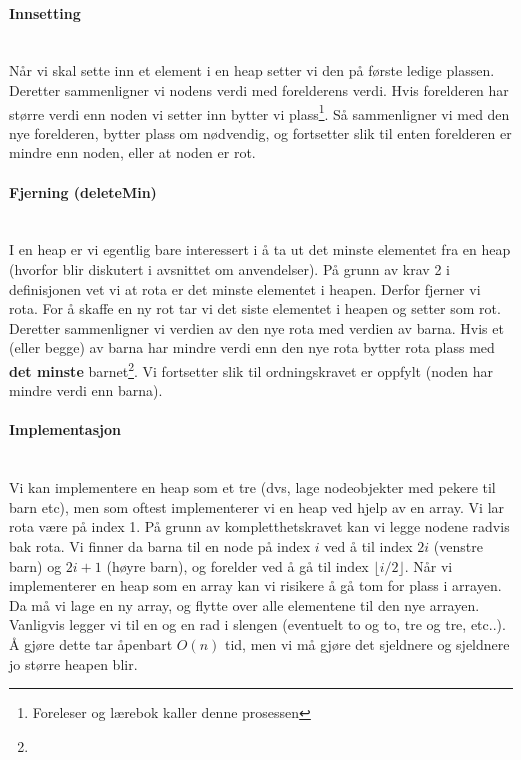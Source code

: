 \paragraph{Innsetting}~\\
Når vi skal sette inn et element i en heap setter vi den på første ledige plassen. Deretter sammenligner vi nodens verdi med forelderens verdi. Hvis forelderen har større verdi enn noden vi setter inn bytter vi plass\footnote{Foreleser og lærebok kaller denne prosessen }. Så sammenligner vi med den nye forelderen, bytter plass om nødvendig, og fortsetter slik til enten forelderen er mindre enn noden, eller at noden er rot. 

\paragraph{Fjerning (deleteMin)}~\\
I en heap er vi egentlig bare interessert i å ta ut det minste elementet fra en heap (hvorfor blir diskutert i avsnittet om anvendelser). På grunn av krav 2 i definisjonen vet vi at rota er det minste elementet i heapen. Derfor fjerner vi rota. For å skaffe en ny rot tar vi det siste elementet i heapen og setter som rot. Deretter sammenligner vi verdien av den nye rota med verdien av barna. Hvis et (eller begge) av barna har mindre verdi enn den nye rota bytter rota plass med \textbf{det minste} barnet\footnote{}. Vi fortsetter slik til ordningskravet er oppfylt (noden har mindre verdi enn barna). 

\paragraph{Implementasjon}~\\
Vi kan implementere en heap som et tre (dvs, lage nodeobjekter med pekere til barn etc), men som oftest implementerer vi en heap ved hjelp av en array. Vi lar rota være på index 1. På grunn av kompletthetskravet kan vi legge nodene radvis bak rota. Vi finner da barna til en node på index $ i $ ved å til index $ 2i $ (venstre barn) og $ 2i+1 $ (høyre barn), og forelder ved å gå til index $ \lfloor i/2 \rfloor $. Når vi implementerer en heap som en array kan vi risikere å gå tom for plass i arrayen. Da må vi lage en ny array, og flytte over alle elementene til den nye arrayen. Vanligvis legger vi til en og en rad i slengen (eventuelt to og to, tre og tre, etc..). Å gjøre dette tar åpenbart $ O(n) $ tid, men vi må gjøre det sjeldnere og sjeldnere jo større heapen blir. 

